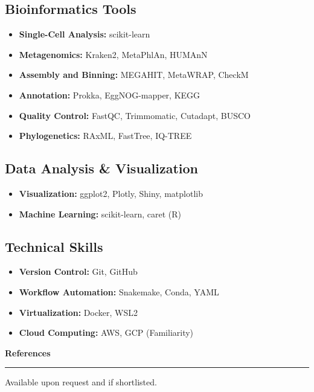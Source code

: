 \documentclass[a4paper,10pt]{article}
\newcommand{\sectiontitle}[1]{\vspace{10pt}\textbf{\Large #1}\vspace{5pt}\hrule\vspace{10pt}}
\begin{document}
	\subsection*{Bioinformatics Tools}
	\begin{itemize}[left=0pt]
		\item \textbf{Single-Cell Analysis:} scikit-learn
		\item \textbf{Metagenomics:} Kraken2, MetaPhlAn, HUMAnN
		\item \textbf{Assembly and Binning:} MEGAHIT, MetaWRAP, CheckM
		\item \textbf{Annotation:} Prokka, EggNOG-mapper, KEGG
		\item \textbf{Quality Control:} FastQC, Trimmomatic, Cutadapt, BUSCO
		\item \textbf{Phylogenetics:} RAxML, FastTree, IQ-TREE
	\end{itemize}
	
	\subsection*{Data Analysis \& Visualization}
	\begin{itemize}[left=0pt]
		\item \textbf{Visualization:} ggplot2, Plotly, Shiny, matplotlib
		\item \textbf{Machine Learning:} scikit-learn, caret (R)
	\end{itemize}
	
	\subsection*{Technical Skills}
	\begin{itemize}[left=0pt]
		\item \textbf{Version Control:} Git, GitHub
		\item \textbf{Workflow Automation:} Snakemake, Conda, YAML
		\item \textbf{Virtualization:} Docker, WSL2
		\item \textbf{Cloud Computing:} AWS, GCP (Familiarity)
	\end{itemize}
	
	\sectiontitle{References}
	Available upon request and if shortlisted.
	
\end{document}
